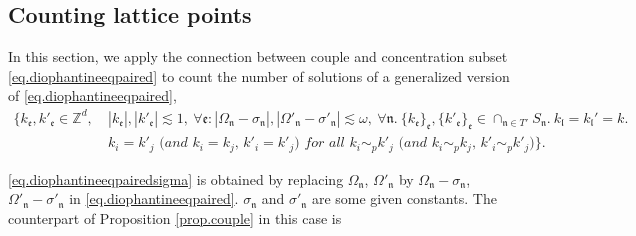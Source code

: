 \subsection{Counting lattice points}\label{sec.numbertheory} In this section, we apply the connection between couple and concentration subset \eqref{eq.diophantineeqpaired} to count the number of solutions of a generalized version of \eqref{eq.diophantineeqpaired},
\begin{equation}\label{eq.diophantineeqpairedsigma}
\begin{split}
    \{k_{\mathfrak{e}}, k'_{\mathfrak{e}}\in \mathbb{Z}^d,\ &|k_{\mathfrak{e}}|, |k'_{\mathfrak{e}}|\lesssim 1,\ \forall \mathfrak{e}: |\Omega_{\mathfrak{n}}-\sigma_{\mathfrak{n}}|,|\Omega'_{\mathfrak{n}}-\sigma'_{\mathfrak{n}}|\lesssim \omega,\ \forall \mathfrak{n}. \ \{k_{\mathfrak{e}}\}_{\mathfrak{e}}, \{k'_{\mathfrak{e}}\}_{\mathfrak{e}}\in \cap_{\mathfrak{n}\in T'} S_{\mathfrak{n}}.\ k_{\mathfrak{l}}=k_{\mathfrak{l}}'=k. \\
    &\textit{$k_{i}=k'_{j}$ (and $k_{i}=k_{j}$, $k'_{i}=k'_{j}$) for all $k_{i}\sim_{p}k'_{j}$ (and $k_{i}\sim_{p}k_{j}$, $k'_{i}\sim_{p}k'_{j}$)}\}.
\end{split}
\end{equation}

\eqref{eq.diophantineeqpairedsigma} is obtained by replacing $\Omega_{\mathfrak{n}}$, $\Omega'_{\mathfrak{n}}$ by $\Omega_{\mathfrak{n}}-\sigma_{\mathfrak{n}}$, $\Omega'_{\mathfrak{n}}-\sigma'_{\mathfrak{n}}$ in \eqref{eq.diophantineeqpaired}. $\sigma_{\mathfrak{n}}$ and $\sigma'_{\mathfrak{n}}$ are some given constants. The counterpart of Proposition \ref{prop.couple} in this case is

